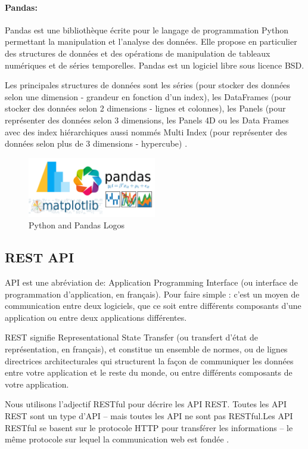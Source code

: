 \paragraph{Pandas:}
Pandas \cite{PandasPythonData} est une bibliothèque écrite pour le langage de programmation Python permettant la manipulation et l'analyse des données. Elle propose en particulier des structures de données et des opérations de manipulation de tableaux numériques et de séries temporelles. Pandas est un logiciel libre sous licence BSD.

Les principales structures de données sont les séries (pour stocker des données selon une dimension - grandeur en fonction d'un index), les DataFrames (pour stocker des données selon 2 dimensions - lignes et colonnes), les Panels (pour représenter des données selon 3 dimensions, les Panels 4D ou les Data Frames avec des index hiérarchiques aussi nommés Multi Index (pour représenter des données selon plus de 3 dimensions - hypercube) \cite{Pandas2020}.


\begin{figure}[h!]
    \center
    \includegraphics[width=0.50\textwidth]{Images/chapter3/python_pandas.png}
    \caption{Python and Pandas Logos}
    \label{fig:Technologies}
\end{figure}

\subsection{REST API}
API est une abréviation de:  Application Programming Interface (ou interface de programmation d’application, en français). Pour faire simple : c’est un moyen de communication entre deux logiciels, que ce soit entre différents composants d’une application ou entre deux applications différentes.

REST signifie Representational State Transfer (ou transfert d’état de représentation, en français), et constitue un ensemble de normes, ou de lignes directrices architecturales qui structurent la façon de communiquer les données entre votre application et le reste du monde, ou entre différents composants de votre application.

Nous utilisons l’adjectif RESTful pour décrire les API REST. Toutes les API REST sont un type d’API – mais toutes les API ne sont pas RESTful.Les API RESTful se basent sur le protocole HTTP pour transférer les informations – le même protocole sur lequel la communication web est fondée \cite{IdentifiezAvantagesAPI}.


